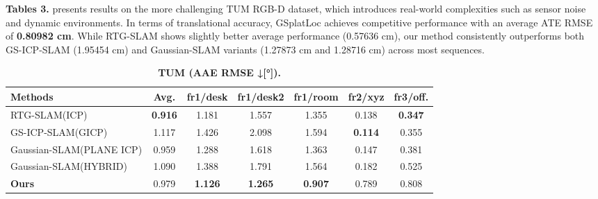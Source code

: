 \documentclass[twocolumn]{article}
\begin{document}
\textbf{Tables 3.} presents results on the more challenging TUM RGB-D
dataset\autocite{sturmBenchmarkEvaluationRGBD2012}, which introduces
real-world complexities such as sensor noise and dynamic environments.
In terms of translational accuracy, GSplatLoc achieves competitive
performance with an average ATE RMSE of \textbf{0.80982 cm}. While
RTG-SLAM\autocite{pengRTGSLAMRealtime3D2024} shows slightly better
average performance (0.57636 cm), our method consistently outperforms
both GS-ICP-SLAM\autocite{haRGBDGSICPSLAM2024} (1.95454 cm) and
Gaussian-SLAM\autocite{yugayGaussianSLAMPhotorealisticDense2024}
variants (1.27873 cm and 1.28716 cm) across most sequences.

\begin{table}[htbp]
\renewcommand{\thetable}{\textbf{\arabic{table}}}
\renewcommand{\tablename}{\textbf{Table}}
\centering
\caption{\textbf{TUM\cite{sturmBenchmarkEvaluationRGBD2012} (AAE RMSE ↓[°]).}}
\label{table:_textbf_tum_cite_stu}
\begin{adjustbox}{max width=\columnwidth,max height=!,center}
\begin{tabular}{lcccccc}
\toprule
\textbf{Methods} & \textbf{Avg.} & \textbf{fr1/desk} & \textbf{fr1/desk2} & \textbf{fr1/room} & \textbf{fr2/xyz} & \textbf{fr3/off.}\\
\midrule
RTG-SLAM(ICP)\cite{pengRTGSLAMRealtime3D2024} & \cellcolor{green!30}\textbf{0.916} & \cellcolor{yellow!30}1.181 & \cellcolor{yellow!30}1.557 & \cellcolor{yellow!30}1.355 & \cellcolor{yellow!30}0.138 & \cellcolor{green!30}\textbf{0.347}\\
GS-ICP-SLAM(GICP)\cite{haRGBDGSICPSLAM2024} & 1.117 & 1.426 & 2.098 & 1.594 & \cellcolor{green!30}\textbf{0.114} & \cellcolor{yellow!30}0.355\\
Gaussian-SLAM(PLANE ICP)\cite{yugayGaussianSLAMPhotorealisticDense2024} & \cellcolor{yellow!30}0.959 & \cellcolor{lime!50}1.288 & \cellcolor{lime!50}1.618 & \cellcolor{lime!50}1.363 & \cellcolor{lime!50}0.147 & \cellcolor{lime!50}0.381\\
Gaussian-SLAM(HYBRID)\cite{yugayGaussianSLAMPhotorealisticDense2024} & 1.090 & 1.388 & 1.791 & 1.564 & 0.182 & 0.525\\
\midrule
\textbf{Ours} & \cellcolor{lime!50}0.979 & \cellcolor{green!30}\textbf{1.126} & \cellcolor{green!30}\textbf{1.265} & \cellcolor{green!30}\textbf{0.907} & 0.789 & 0.808\\
\bottomrule
\end{tabular}
\end{adjustbox}
\end{table}
\end{document}
